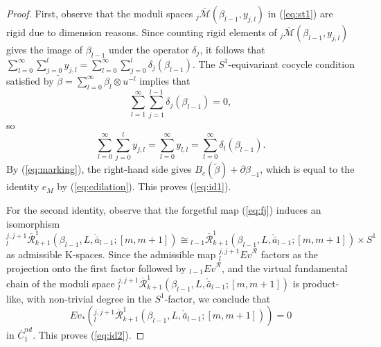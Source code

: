 \documentclass[a4paper]{article}
\numberwithin{equation}{section}
\begin{document}
\begin{proof}
First, observe that the moduli spaces ${}_j\overline{\mathcal{M}}(\beta_{l-1},y_{j,l})$ in (\ref{eq:st1}) are rigid due to dimension reasons. Since counting rigid elements of ${}_j\overline{\mathcal{M}}(\beta_{l-1},y_{j,l})$ gives the image of $\beta_{l-1}$ under the operator $\delta_j$, it follows that $\sum_{l=0}^\infty\sum_{j=0}^ly_{j,l}=\sum_{l=0}^\infty\sum_{j=0}^l\delta_j(\beta_{l-1})$. The $S^1$-equivariant cocycle condition satisfied by $\tilde{\beta}=\sum_{l=0}^\infty\beta_l\otimes u^{-l}$ implies that
\begin{equation}
\sum_{l=1}^\infty\sum_{j=1}^{l-1}\delta_j(\beta_{l-1})=0,
\end{equation}
so
\begin{equation}
\sum_{l=0}^\infty\sum_{j=0}^ly_{j,l}=\sum_{l=0}^\infty y_{l,l}=\sum_{l=0}^\infty\delta_l(\beta_{l-1}).
\end{equation}
By (\ref{eq:marking}), the right-hand side gives $B_c(\tilde{\beta})+\partial\beta_{-1}$, which is equal to the identity $e_M$ by (\ref{eq:cdilation}). This proves (\ref{eq:id1}).

For the second identity, observe that the forgetful map (\ref{eq:fj}) induces an isomorphism
\begin{equation}\label{eq:split}
{}_l^{j,j+1}\overline{\mathcal{R}}_{k+1}^1(\beta_{l-1},L,\ring{\bar{a}}_{l-1};[m,m+1])\cong{}_{l-1}\overline{\mathcal{R}}_{k+1}^1(\beta_{l-1},L,\ring{\bar{a}}_{l-1};[m,m+1])\times S^1
\end{equation}
as admissible K-spaces. Since the admissible map ${}_l^{j,j+1}\mathit{Ev}^\mathcal{R}$ factors as the projection onto the first factor followed by ${}_{l-1}\mathit{Ev}^\mathcal{R}$, and the virtual fundamental chain of the moduli space ${}_l^{j,j+1}\overline{\mathcal{R}}_{k+1}^1(\beta_{l-1},L,\ring{\bar{a}}_{l-1};[m,m+1])$ is product-like, with non-trivial degree in the $S^1$-factor, we conclude that
\begin{equation}
\mathit{Ev}_\ast\left({}_l^{j,j+1}\overline{\mathcal{R}}_{k+1}^1(\beta_{l-1},L,\ring{\bar{a}}_{l-1};[m,m+1])\right)=0
\end{equation}
in $\overline{C}_1^\mathit{nd}$. This proves (\ref{eq:id2}).
	

\end{proof}
\end{document}
